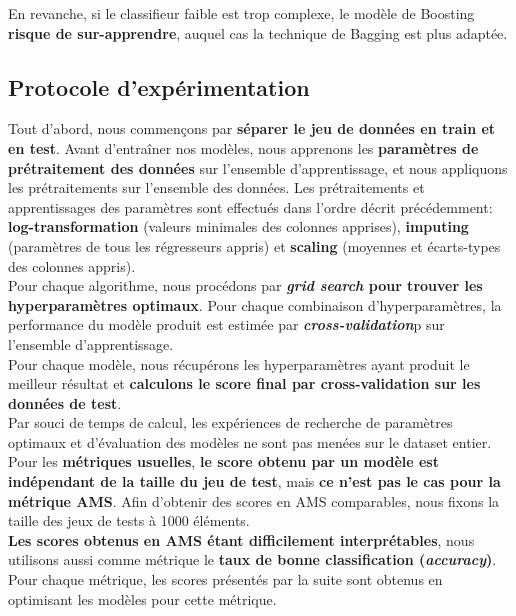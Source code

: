 \documentclass[12pt]{article}
\begin{document}
En revanche, si le classifieur faible est trop complexe, le modèle de Boosting
\textbf{risque de sur-apprendre}, auquel cas la technique de Bagging est plus
adaptée.\\

\subsection{Protocole d'expérimentation} 

Tout d'abord, nous commençons par \textbf{séparer le jeu de données en train et
en test}.  Avant d'entraîner nos modèles, nous apprenons les \textbf{paramètres
de prétraitement des données} sur l'ensemble d'apprentissage, et nous appliquons
les prétraitements sur l'ensemble des données. Les prétraitements et
apprentissages des paramètres sont effectués dans l'ordre décrit précédemment:
\textbf{log-transformation} (valeurs minimales des colonnes apprises),
\textbf{imputing} (paramètres de tous les régresseurs appris) et
\textbf{scaling} (moyennes et écarts-types des colonnes appris). \\

Pour chaque algorithme, nous procédons par \textbf{\emph{grid search} pour
trouver les hyperparamètres optimaux}. Pour chaque combinaison
d'hyperparamètres, la performance du modèle produit est estimée par
\textbf{\emph{cross-validation}}p sur l'ensemble d'apprentissage. \\

Pour chaque modèle, nous récupérons les hyperparamètres ayant produit le
meilleur résultat et \textbf{calculons le score final par cross-validation sur les
données de test}. \\

Par souci de temps de calcul, les expériences de recherche de paramètres
optimaux et d'évaluation des modèles ne sont pas menées sur le dataset entier.
Pour les \textbf{métriques usuelles}, \textbf{le score obtenu par un modèle est
indépendant de la taille du jeu de test}, mais \textbf{ce n'est pas le cas pour
la métrique AMS}.  Afin d'obtenir des scores en AMS comparables, nous fixons la
taille des jeux de tests à 1000 éléments. \\

\textbf{Les scores obtenus en AMS étant difficilement interprétables}, nous
utilisons aussi comme métrique le \textbf{taux de bonne classification
(\emph{accuracy})}. Pour chaque métrique, les scores présentés par la suite sont
obtenus en optimisant les modèles pour cette métrique.
\end{document}
